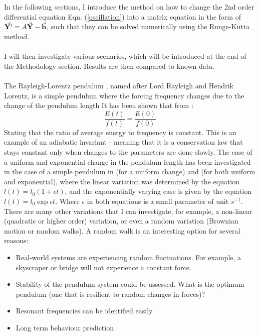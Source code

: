 \documentclass[10pt, twocolumn]{article}
\begin{document}
\\
\\
In the following sections, I introduce the method on how to change the 2nd order differential equation Eqn. (\ref{oscillation}) into a matrix equation in the form of $\vec{\bold{Y'}} = A\vec{\bold{Y}} - \vec{\bold{b}}$, such that they can be solved numerically using the Runge-Kutta method.
\\
\\
I will then investigate various scenarios, which will be introduced at the end of the Methodology section. Results are then compared to known data.
\\
\\
The Rayleigh-Lorentz pendulum \cite{Rayleigh1902}, named after Lord Rayleigh and Hendrik Lorentz, is a simple pendulum where the forcing frequency changes due to the change of the pendulum length
It has been shown that from \cite{Rayleigh1902}:
\begin{equation}
    \frac{E(t)}{f(t)} = \frac{E(0)}{f(0)}
    \label{adiabatic}
\end{equation}
Stating that the ratio of average energy to frequency is constant. This is an example of an adiabatic invariant - meaning that it is a conservation law that stays constant only when changes to the parameters are done slowly. The case of a uniform and exponential change in the pendulum length has been investigated in the case of a simple pendulum in \cite{Brearley1966, Werner1969, Ross1979} (for a uniform change) and \cite{SanchezZoido2013} (for both uniform and exponential), where the linear variation was determined by the equation $l(t) = l_0 (1 + \epsilon{t})$, and the exponentially varying case is given by the equation $l(t) = l_0\exp{\epsilon t}$. Where $\epsilon$ in both equations is a small parameter of unit $s^{-1}$. There are many other variations that I can investigate, for example, a non-linear (quadratic or higher order) variation, or even a random variation (Brownian motion or random walks). A random walk is an interesting option for several reasons:
\begin{itemize}
    \item Real-world systems are experiencing random fluctuations. For example, a skyscraper or bridge will not experience a constant force.
    \item Stability of the pendulum system could be assessed. What is the optimum pendulum (one that is resilient to random changes in forces)?
    \item Resonant frequencies can be identified easily
    \item Long term behaviour prediction
\end{itemize}
\end{document}
